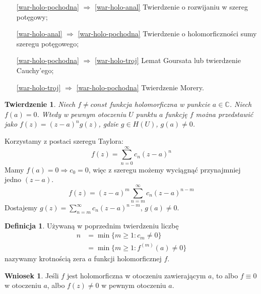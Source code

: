 \documentclass[11pt]{article}
\theoremstyle{plain}
\newtheorem*{theorem}{Twierdzenie}
\theoremstyle{definition}
\newtheorem*{definition}{Definicja}
\newtheorem*{corollary}{Wniosek}
\theoremstyle{remark}
\let\oldendproof\endproof
\renewenvironment{proof}[1][\proofname]{
  \oldproof[\textsc{\small #1}]
}{\oldendproof}
\begin{document}
\begin{proof}
  $ $
  \begin{enumerate}[leftmargin=5.1em]
    \item[\ref{war-holo-pochodna} $ \Rightarrow $ \ref{war-holo-anal}]%
    Twierdzenie o rozwijaniu w szereg potęgowy;

    \item[\ref{war-holo-anal} $ \Rightarrow $ \ref{war-holo-pochodna}]
    Twierdzenie o holomorficzności sumy szeregu potęgowego;

    \item[\ref{war-holo-pochodna} $ \Rightarrow $ \ref{war-holo-troj}]
    Lemat Goursata lub twierdzenie Cauchy’ego;

    \item[\ref{war-holo-troj} $ \Rightarrow $ \ref{war-holo-pochodna}]
    Twierdzenie Morery.
  \end{enumerate}
\end{proof}

\begin{theorem}
  Niech $ f \neq const $ funkcja holomorficzna w punkcie $ a \in \mathbb{C} $.
  Niech $ f(a) = 0 $.
  Wtedy w pewnym otoczeniu $ U $ punktu $ a $ funkcję $ f $ można przedstawić jako $ f(z) = (z-a)^{n}g(z) $,
  gdzie $ g \in H(U) $, $ g(a) \neq 0 $.
\end{theorem}

\begin{proof}
  Korzystamy z postaci szeregu Taylora:
  $$ f(z) = \sum_{n=0}^{\infty} c_n(z-a)^n $$
  Mamy $ f(a) = 0 \Rightarrow c_0 = 0 $, więc z szeregu możemy wyciągnąć przynajmniej jedno $ (z-a) $.
  $$ f(z) = (z-a)^m \sum_{n=m}^{\infty} c_n(z-a)^{n-m} $$
  Dostajemy $ g(z) = \sum_{n=m}^{\infty} c_n(z-a)^{n-m} $, $ g(a) \neq 0 $.
\end{proof}

\begin{definition}
  Używaną w poprzednim twierdzeniu liczbę
  \begin{align*}
    n &
    = \min \{m \geq 1: c_m \neq 0\} \\ &
    = \min \{m \geq 1: f^{(m)}(a) \neq 0\}
  \end{align*}
  nazywamy krotnością zera $ a $ funkcji holomorficznej $ f $.
\end{definition}

\begin{corollary}
  Jeśli $ f $ jest holomorficzna w otoczeniu zawierającym $ a $, to
  albo $ f \equiv 0 $ w otoczeniu $ a $,
  albo $ f(z) \neq 0 $ w pewnym otoczeniu $ a $.
\end{corollary}
\end{document}
